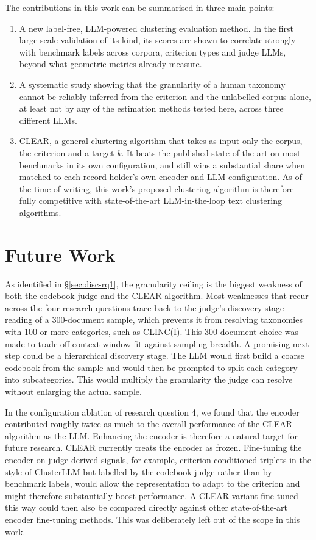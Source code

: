 \documentclass[11pt,a4paper,oneside]{report}
\begin{document}
The contributions in this work can be summarised in three main points:
\begin{enumerate}
    \item A new label-free, LLM-powered clustering evaluation method. In the first large-scale validation of its kind, its scores are shown to correlate strongly
    with benchmark labels across corpora, criterion types and judge LLMs,
    beyond what geometric metrics already measure.
    \item A systematic study showing that the granularity of a human
    taxonomy cannot be reliably inferred from the criterion and the
    unlabelled corpus alone, at least not by any of the
    estimation methods tested here, across three different LLMs.
     \item CLEAR, a general clustering algorithm that takes as input only the corpus, the criterion and a target $k$. It beats the published state of the art on most benchmarks in its own configuration, and still wins a substantial share when matched to each record holder's own encoder and LLM configuration. As of the time of writing, this work's proposed clustering algorithm is therefore fully competitive with state-of-the-art LLM-in-the-loop text clustering algorithms.

\end{enumerate}

\section{Future Work}

As identified in \S\ref{sec:disc-rq1}, the granularity ceiling is the biggest weakness of both the codebook judge and the CLEAR algorithm. Most weaknesses that recur across the four research questions trace back to the judge's discovery-stage reading of a 300-document sample, which prevents it from resolving taxonomies with 100 or more categories, such as CLINC(I). This 300-document choice was made to trade off context-window fit against sampling breadth. A promising next step could be a hierarchical discovery stage. The LLM would
first build a coarse codebook from the sample and would then be prompted to split
each category into subcategories. This would multiply the granularity the judge can resolve
without enlarging the actual sample.


In the configuration ablation of research question 4, we found that the encoder contributed roughly twice as much to the overall performance of the CLEAR algorithm as the LLM. Enhancing the encoder is therefore a natural target for future research. CLEAR currently treats the encoder as frozen. Fine-tuning
the encoder on judge-derived signals, for example, criterion-conditioned triplets in the style of ClusterLLM but labelled by the codebook judge rather than by benchmark labels,
would allow the representation to adapt to the criterion and might therefore substantially boost performance. A CLEAR variant fine-tuned this way could then also be compared directly
against other state-of-the-art encoder fine-tuning methods. This was deliberately left out of the scope in this work. 
\end{document}
